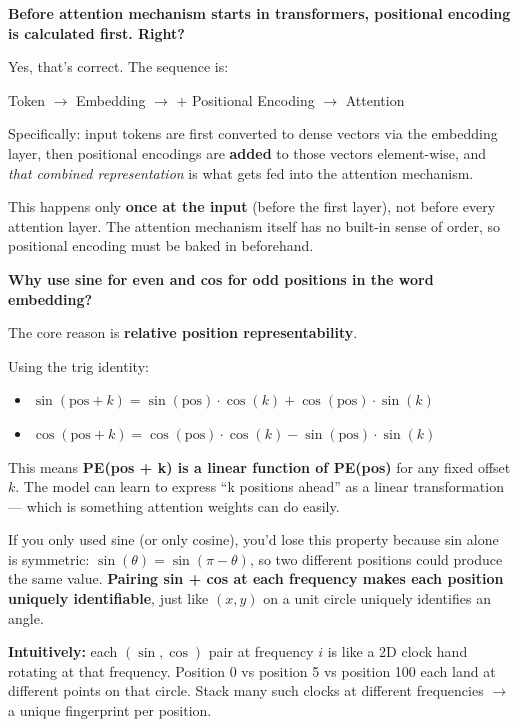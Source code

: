 \textbf{Before attention mechanism starts in transformers, positional encoding is calculated first. Right?}

Yes, that's correct. The sequence is:

\medskip
Token $\rightarrow$ Embedding $\rightarrow$ + Positional Encoding $\rightarrow$ Attention
\medskip

Specifically: input tokens are first converted to dense vectors via the embedding layer, then positional encodings are \textbf{added} to those vectors element-wise, and \textit{that combined representation} is what gets fed into the attention mechanism.

This happens only \textbf{once at the input} (before the first layer), not before every attention layer. The attention mechanism itself has no built-in sense of order, so positional encoding must be baked in beforehand.

\bigskip

\textbf{Why use sine for even and cos for odd positions in the word embedding?}

The core reason is \textbf{relative position representability}.

Using the trig identity:
\begin{itemize}
  \item $\sin(\text{pos} + k) = \sin(\text{pos}) \cdot \cos(k) + \cos(\text{pos}) \cdot \sin(k)$
  \item $\cos(\text{pos} + k) = \cos(\text{pos}) \cdot \cos(k) - \sin(\text{pos}) \cdot \sin(k)$
\end{itemize}

This means \textbf{PE(pos + k) is a linear function of PE(pos)} for any fixed offset $k$. The model can learn to express ``k positions ahead'' as a linear transformation --- which is something attention weights can do easily.

If you only used sine (or only cosine), you'd lose this property because sin alone is symmetric: $\sin(\theta) = \sin(\pi - \theta)$, so two different positions could produce the same value. \textbf{Pairing sin + cos at each frequency makes each position uniquely identifiable}, just like $(x, y)$ on a unit circle uniquely identifies an angle.

\textbf{Intuitively:} each $(\sin, \cos)$ pair at frequency $i$ is like a 2D clock hand rotating at that frequency. Position 0 vs position 5 vs position 100 each land at different points on that circle. Stack many such clocks at different frequencies $\rightarrow$ a unique fingerprint per position.


